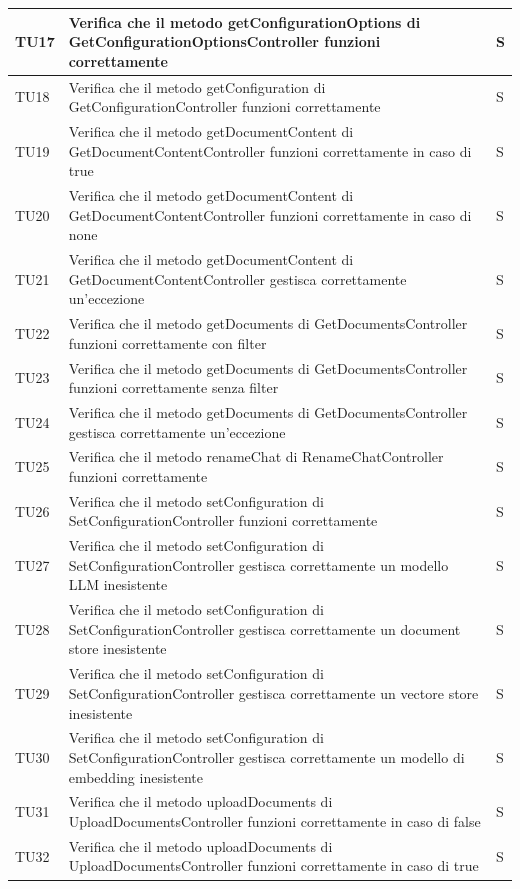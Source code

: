 \documentclass[10pt, a4paper]{article}
\begin{document}
\begin{xltabular}{\textwidth}{p{0.12\textwidth}|p{0.7\textwidth}|X}
\hline
TU17 & Verifica che il metodo getConfigurationOptions di GetConfigurationOptionsController funzioni correttamente & S \\
\hline
TU18 & Verifica che il metodo getConfiguration di GetConfigurationController funzioni correttamente & S \\
\hline
TU19 & Verifica che il metodo getDocumentContent di GetDocumentContentController funzioni correttamente in caso di true & S \\
\hline
TU20 & Verifica che il metodo getDocumentContent di GetDocumentContentController funzioni correttamente in caso di none & S \\
\hline
TU21 & Verifica che il metodo getDocumentContent di GetDocumentContentController gestisca correttamente un'eccezione & S \\
\hline
TU22 & Verifica che il metodo getDocuments di GetDocumentsController funzioni correttamente con filter & S \\
\hline
TU23 & Verifica che il metodo getDocuments di GetDocumentsController funzioni correttamente senza filter & S \\
\hline
TU24 & Verifica che il metodo getDocuments di GetDocumentsController gestisca correttamente un'eccezione & S \\
\hline
TU25 & Verifica che il metodo renameChat di RenameChatController funzioni correttamente & S \\
\hline
TU26 & Verifica che il metodo setConfiguration di SetConfigurationController funzioni correttamente & S \\
\hline
TU27 & Verifica che il metodo setConfiguration di SetConfigurationController gestisca correttamente un modello LLM inesistente & S \\
\hline
TU28 & Verifica che il metodo setConfiguration di SetConfigurationController gestisca correttamente un document store inesistente & S \\
\hline
TU29 & Verifica che il metodo setConfiguration di SetConfigurationController gestisca correttamente un vectore store inesistente & S \\
\hline
TU30 & Verifica che il metodo setConfiguration di SetConfigurationController gestisca correttamente un modello di embedding inesistente & S \\
\hline
TU31 & Verifica che il metodo uploadDocuments di UploadDocumentsController funzioni correttamente in caso di false & S \\
\hline
TU32 & Verifica che il metodo uploadDocuments di UploadDocumentsController funzioni correttamente in caso di true & S \\

\end{xltabular}
\end{document}
